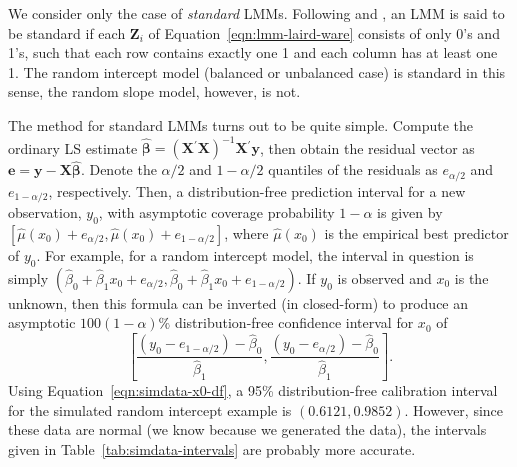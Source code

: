 \documentclass[cmfont,usenames,dvipsnames,leqno]{afit-etd}\usepackage[]{graphicx}\usepackage[]{color}
\newcommand{\trans}{\ensuremath{^\prime}}
\newcommand{\wh}[1]{\ensuremath{\widehat{#1}}}
\newcommand{\X}{\ensuremath{\bm{X}}}
\newcommand{\Z}{\ensuremath{\bm{Z}}}
\begin{document}
We consider only the case of \textit{standard} LMMs. Following \citet{jiang_distribution_2002} and \citet{jiang_linear_2007}, an \ac{LMM} is said to be standard if each $\Z_i$ of Equation~\eqref{eqn:lmm-laird-ware} consists of only 0's and 1's, such that each row contains exactly one 1 and each column has at least one 1. The random intercept model (balanced or unbalanced case) is standard in this sense, the random slope model, however, is not. 

The method for standard LMMs turns out to be quite simple. Compute the ordinary \ac{LS} estimate $\wh{\bm{\beta}} = \left(\X\trans\X\right)^{-1}\X\trans\bm{y}$, then obtain the residual vector as $\bm{e} = \bm{y} - \X\wh{\bm{\beta}}$. Denote the $\alpha/2$ and $1-\alpha/2$ quantiles of the residuals as $e_{\alpha/2}$ and $e_{1-\alpha/2}$, respectively. Then, a distribution-free prediction interval for a new observation, $y_0$, with asymptotic coverage probability $1-\alpha$ is given by
$\left[\wh{\mu}(x_0) + e_{\alpha/2}, \wh{\mu}(x_0) + e_{1-\alpha/2}\right]$, where $\wh{\mu}(x_0)$ is the empirical best predictor of $y_0$. For example, for a random intercept model, the interval in question is simply $\left(\wh{\beta}_0 + \wh{\beta}_1 x_0 + e_{\alpha/2}, \wh{\beta}_0 + \wh{\beta}_1 x_0 + e_{1-\alpha/2}\right)$. If $y_0$ is observed and $x_0$ is the unknown, then this formula can be inverted (in closed-form) to produce an asymptotic $100(1-\alpha)\%$ distribution-free confidence interval for $x_0$ of
\begin{equation} 
\label{eqn:simdata-x0-df}
  \left[ \frac{\left(y_0 - e_{1-\alpha/2}\right) - \wh{\beta}_0}{\wh{\beta}_1}, \frac{\left(y_0 - e_{\alpha/2}\right) - \wh{\beta}_0}{\wh{\beta}_1} \right].
\end{equation}
Using Equation~\eqref{eqn:simdata-x0-df}, a 95\% distribution-free calibration interval for the simulated random intercept example is $(0.6121, 0.9852)$. However, since these data are normal (we know because we generated the data), the intervals given in Table~\ref{tab:simdata-intervals} are probably more accurate. 
\end{document}
